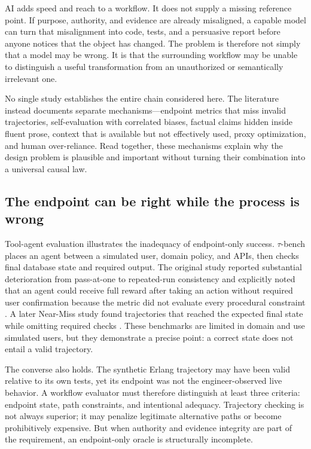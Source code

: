 \documentclass[10pt,a4paper]{article}
\begin{document}
AI adds speed and reach to a workflow. It does not supply a missing reference point. If purpose, authority, and evidence are already misaligned, a capable model can turn that misalignment into code, tests, and a persuasive report before anyone notices that the object has changed. The problem is therefore not simply that a model may be wrong. It is that the surrounding workflow may be unable to distinguish a useful transformation from an unauthorized or semantically irrelevant one.

No single study establishes the entire chain considered here. The literature instead documents separate mechanisms---endpoint metrics that miss invalid trajectories, self-evaluation with correlated biases, factual claims hidden inside fluent prose, context that is available but not effectively used, proxy optimization, and human over-reliance. Read together, these mechanisms explain why the design problem is plausible and important without turning their combination into a universal causal law.

\subsection{The endpoint can be right while the process is wrong}

Tool-agent evaluation illustrates the inadequacy of endpoint-only success. $\tau$-bench places an agent between a simulated user, domain policy, and APIs, then checks final database state and required output. The original study reported substantial deterioration from pass-at-one to repeated-run consistency and explicitly noted that an agent could receive full reward after taking an action without required user confirmation because the metric did not evaluate every procedural constraint \cite{taubench}. A later Near-Miss study found trajectories that reached the expected final state while omitting required checks \cite{nearmiss2026}. These benchmarks are limited in domain and use simulated users, but they demonstrate a precise point: a correct state does not entail a valid trajectory.

The converse also holds. The synthetic Erlang trajectory may have been valid relative to its own tests, yet its endpoint was not the engineer-observed live behavior. A workflow evaluator must therefore distinguish at least three criteria: endpoint state, path constraints, and intentional adequacy. Trajectory checking is not always superior; it may penalize legitimate alternative paths or become prohibitively expensive. But when authority and evidence integrity are part of the requirement, an endpoint-only oracle is structurally incomplete.
\end{document}
